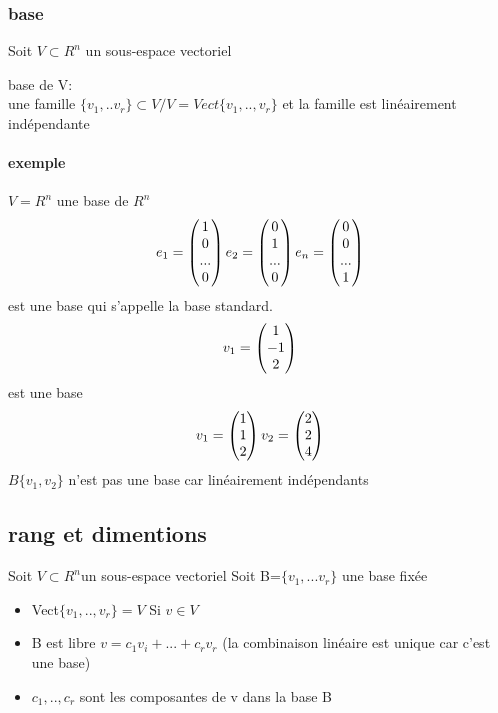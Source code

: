 \documentclass[a4paper,10pt]{article}
\begin{document}
\subsubsection{base}
Soit $V\subset R^n$ un sous-espace vectoriel
\begin{description}
 \item base de V:\\{une famille $\{v_1,..v_r\}\subset V/V=Vect\{v_1,..,v_r\}$ et la famille est linéairement indépendante}
\end{description}
\paragraph{exemple}
$V=R^n$ une base de $R^n$
\[
e_1=
\begin{pmatrix}
1\cr
0\cr
...\cr
0\cr
\end{pmatrix}
e_2=
\begin{pmatrix}
0\cr
1\cr
...\cr
0\cr
\end{pmatrix}
e_n=
\begin{pmatrix}
0\cr
0\cr
...\cr
1\cr
\end{pmatrix}
\]
est une base qui s'appelle la base standard.
\newline
\[
v_1=
\begin{pmatrix}
1\cr
-1\cr
2\cr
\end{pmatrix}\]
est une base 
\newline
\[
v_1=
\begin{pmatrix}
1\cr
1\cr
2\cr
\end{pmatrix}
v_2=
\begin{pmatrix}
2\cr
2\cr
4\cr
\end{pmatrix}
\]
\newline
$B\{v_1,v_2\}$ n'est pas une base car linéairement indépendants

\subsection{rang et dimentions}
Soit $V\subset R^n$un sous-espace vectoriel
\newline
Soit B=$\{v_1,...v_r\}$ une base fixée
\begin{itemize}
 \item Vect$\{v_1,..,v_r\}=V$ Si $v\in V$
 \item B est libre $v=c_1v_i+...+c_rv_r$ (la combinaison linéaire est unique car c'est une base)
 \item $c_1,..,c_r$ sont les composantes de v dans la base B
\end{itemize}
\end{document}

